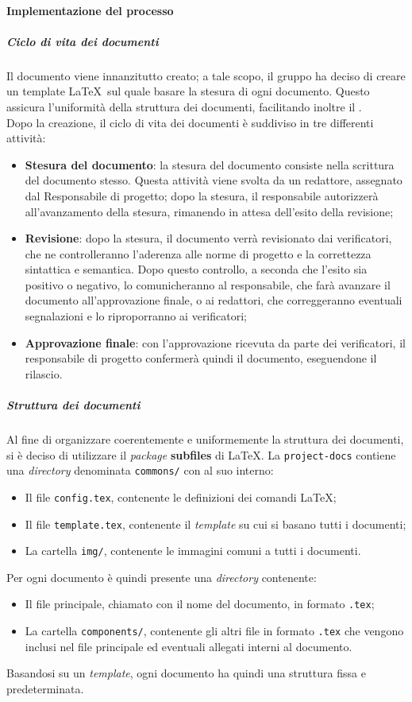 \documentclass[../norme-di-progetto.tex]{subfiles}
\begin{document}
\paragraph{Implementazione del processo}
\subparagraph{Ciclo di vita dei documenti}
Il documento viene innanzitutto creato; a tale scopo, il gruppo ha deciso di creare un template \LaTeX\ sul quale basare la stesura di ogni documento. Questo assicura l'uniformità della struttura dei documenti, facilitando inoltre il . \\
Dopo la creazione, il ciclo di vita dei documenti è suddiviso in tre differenti attività:
\begin{itemize}
  \item \textbf{Stesura del documento}: la stesura del documento consiste nella scrittura del documento stesso. Questa attività viene svolta da un redattore, assegnato dal Responsabile di progetto; dopo la stesura, il responsabile autorizzerà all'avanzamento della stesura, rimanendo in attesa dell'esito della revisione;
  \item \textbf{Revisione}: dopo la stesura, il documento verrà revisionato dai verificatori, che ne controlleranno l'aderenza alle norme di progetto e la correttezza sintattica e semantica. Dopo questo controllo, a seconda che l'esito sia positivo o negativo, lo comunicheranno al responsabile, che farà avanzare il documento all'approvazione finale, o ai redattori, che correggeranno eventuali segnalazioni e lo riproporranno ai verificatori;
  \item \textbf{Approvazione finale}: con l'approvazione ricevuta da parte dei verificatori, il responsabile di progetto confermerà quindi il documento, eseguendone il rilascio.
\end{itemize}

\subparagraph{Struttura dei documenti}
Al fine di organizzare coerentemente e uniformemente la struttura dei documenti, si è deciso di utilizzare il \textit{package} \textbf{subfiles} di \LaTeX. La  \texttt{project-docs} contiene una \textit{directory} denominata \texttt{commons/} con al suo interno:
\begin{itemize}
  \item Il file \texttt{config.tex}, contenente le definizioni dei comandi \LaTeX;
  \item Il file \texttt{template.tex}, contenente il \textit{template} su cui si basano tutti i documenti;
  \item La cartella \texttt{img/}, contenente le immagini comuni a tutti i documenti.
\end{itemize}
Per ogni documento è quindi presente una \textit{directory} contenente:
\begin{itemize}
  \item  Il file principale, chiamato con il nome del documento, in formato \texttt{.tex};
  \item La cartella \texttt{components/}, contenente gli altri file in formato \texttt{.tex} che vengono inclusi nel file principale ed eventuali allegati interni al documento.
\end{itemize}
Basandosi su un \textit{template}, ogni documento ha quindi una struttura fissa e predeterminata.
\end{document}
